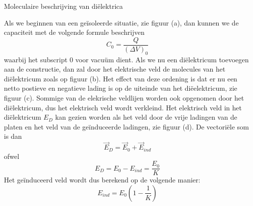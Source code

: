 \begin{app}{Moleculaire beschrijving van diëlektrica}
    \vspace{-0.5cm}
    \begin{minipage}{.75\textwidth}
        Als we beginnen van een geïsoleerde situatie, zie figuur (a), dan kunnen we de capaciteit met de volgende formule beschrijven
        \begin{equation*}
            C_0 = \dfrac{Q}{(\Delta V)_0}
        \end{equation*}
        \noindent waarbij het subscript $0$ voor vacuüm dient. Als we nu een diëlektricum toevoegen aan de constructie, dan zal door het elektrische veld de molecules van het diëlektricum zoals op figuur (b). Het effect van deze ordening is dat er nu een netto postieve en negatieve lading is op de uiteinde van het diëelektricum, zie figuur (c). Sommige van de elekrische veldlijen worden ook opgenomen door het diëlektricum, dus het elektrisch veld wordt verkleind. Het elektrisch veld in het diëlektricum $E_D$ kan gezien worden als het veld door de vrije ladingen van de platen en het veld van de geïnduceerde ladingen, zie figuur (d). De vectoriële som is dan
        \begin{equation*}
            \Vec{E}_D = \Vec{E}_0 + \Vec{E}_{ind}
        \end{equation*}
        ofwel
        \begin{equation*}
            E_D = E_0 - E_{ind} = \dfrac{E_0}{K}
        \end{equation*}
        Het geïnduceerd veld wordt dus berekend op de volgende manier:
        \begin{equation*}
            E_{ind} = E_0(1-\dfrac{1}{K})
        \end{equation*}
    \end{minipage}
    \hspace{0.5cm}
    \begin{minipage}{.18\textwidth}

\end{minipage}
\end{app}
